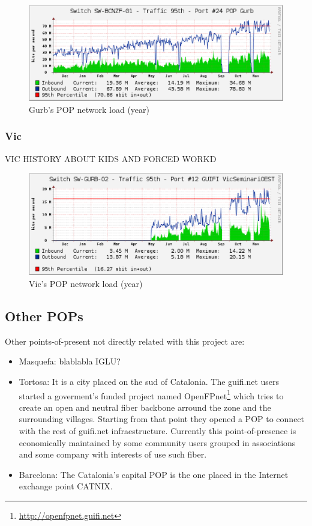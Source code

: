 \begin{figure}[htbp]
  \centering
  \includegraphics[scale=.65]{sect3/figures/gurb_network_load_year.eps} 
  \caption{Gurb's POP network load (year)}
  \label{fig:gurb_net_load}
\end{figure}


\subsubsection{Vic}

VIC HISTORY ABOUT KIDS AND FORCED WORKD

\begin{figure}[htbp]
  \centering
  \includegraphics[scale=.65]{sect3/figures/vic_network_load_year.eps} 
  \caption{Vic's POP network load (year)}
  \label{fig:vic_net_load}
\end{figure}



\subsection{Other POPs}

Other points-of-present not directly related with this project are:

\begin{itemize}
	\item Masquefa: blablabla IGLU?

	\item Tortosa: It is a city placed on the sud of Catalonia. The guifi.net users started a goverment's funded project named 
		OpenFPnet\footnote{\url{http://openfpnet.guifi.net}} which tries to create an open and neutral fiber backbone 
		arround the zone and the surrounding villages. Starting from that point they opened a POP to connect with the 
		rest of guifi.net infraestructure. Currently this point-of-presence is economically maintained by some community 
		users grouped in associations and some company with interests of use such fiber.

	\item Barcelona: The Catalonia's capital POP is the one placed in the Internet exchange point CATNIX.
\end{itemize}

